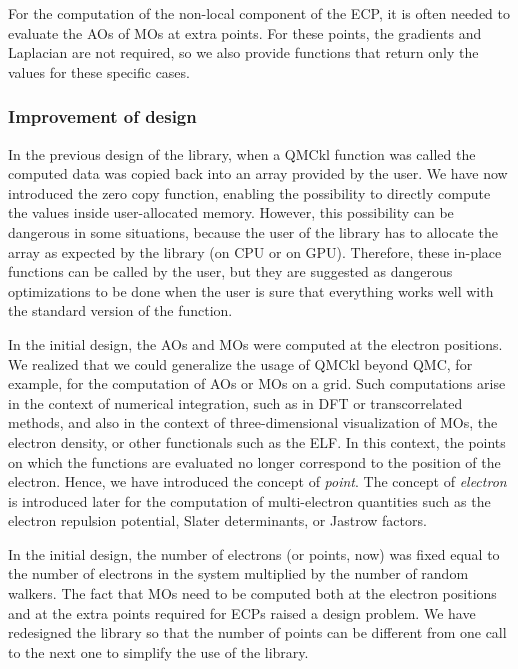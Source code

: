 For the computation of the non-local component of the
\ac{ECP}, it is often needed to evaluate the \acp{AO} of
\acp{MO} at extra points. For these points, the gradients and
Laplacian are not required, so we also provide functions that return only
the values for these specific cases.


\subsubsection{Improvement of design}

In the previous design of the library, when a QMCkl function was called the computed
data was copied back into an array provided by the user. We have now
introduced the zero copy function, enabling the possibility to directly compute the
values inside user-allocated memory. However, this possibility
can be dangerous in some situations, because the user of the library has to allocate
the array as expected by the library (on CPU or on GPU). Therefore, these in-place functions
can be called by the user, but they are suggested as dangerous
optimizations to be done when the user is sure that everything works
well with the standard version of the function.

In the initial design, the \acp{AO} and \acp{MO} were computed at the
electron positions. We realized that we could generalize the
usage of QMCkl beyond QMC, for example, for the computation of
\acp{AO} or \acp{MO} on a grid. Such computations arise in the context
of numerical integration, such as in \ac{DFT} or transcorrelated methods,
and also in the context of three-dimensional visualization of \acp{MO},
the electron density, or other functionals such as the \ac{ELF}.\cite{silvi_1994}
In this context, the points on which the functions are evaluated no longer
correspond to the position of the electron. Hence, we have introduced the concept of
\emph{point}.  The concept of \emph{electron} is introduced later for the
computation of multi-electron quantities such as the electron repulsion potential,
Slater determinants, or Jastrow factors.

In the initial design, the number of electrons (or points,
now) was fixed equal to the number of electrons in the system
multiplied by the number of random walkers. The fact that \acp{MO} need to be
computed both at the electron positions and at the extra points required
for \acp{ECP} raised a design problem. We have redesigned
the library so that the number of points can be different from one
call to the next one to simplify the use of the library.

